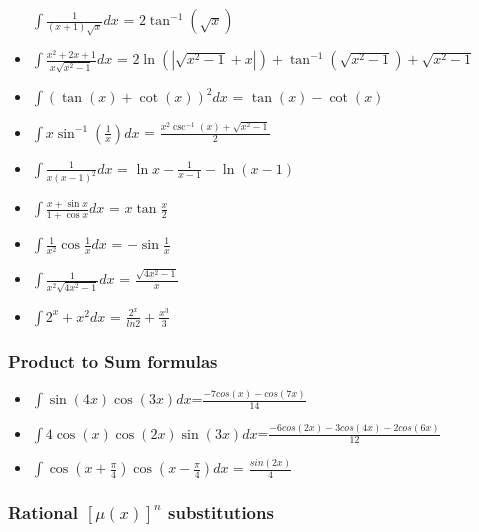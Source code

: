 \begin{itemize}
  \(\displaystyle\int \frac{1}{(x+1)\sqrt{x}}dx\) =
  \(2\tan^{-1}(\sqrt{x})\)
\item
  \(\displaystyle\int \frac{x^2 + 2x + 1}{x\sqrt{x^2-1}}dx\) =
  \(2\ln(|\sqrt{x^2-1}+x|)+\tan^{-1}(\sqrt{x^2-1})+\sqrt{x^2-1}\)
\item
  \(\displaystyle\int (\tan(x) + \cot(x))^2dx\) = \(\tan(x)-\cot(x)\)
\item
  \(\displaystyle\int x\sin^{-1}\left(\frac{1}{x}\right)dx\) =
  \(\frac{x^2\csc^{-1}(x)+\sqrt{x^2-1}}{2}\)
\item
  \(\displaystyle\int \frac{1}{x(x-1)^2}dx\) =
  \(\ln{x}-\frac{1}{x-1}-\ln(x-1)\)
\item
  \(\displaystyle\int \frac{x+\sin{x}}{1+\cos{x}}dx\) =
  \(x\tan{\frac{x}{2}}\)
\item
  \(\displaystyle\int \frac{1}{x^2}\cos{\frac{1}{x}}dx\) =
  \(-\sin{\frac{1}{x}}\)
\item
  \(\displaystyle\int \frac{1}{x^2\sqrt{4x^2-1}}dx\) =
  \(\frac{\sqrt{4x^2-1}}{x}\)
\item
  \(\displaystyle\int 2^x+x^2dx\) = \(\frac{2^x}{ln2}+\frac{x^3}{3}\)
\end{itemize}

\hypertarget{product-to-sum-formulas}{%
\subsubsection{Product to Sum formulas}\label{product-to-sum-formulas}}

\begin{itemize}
\tightlist
\item
  \(\displaystyle\int \sin(4x)\cos(3x)dx\)=\(\frac{-7cos(x)-cos(7x)}{14}\)
\item
  \(\displaystyle\int 4\cos(x)\cos(2x)\sin(3x)dx\)=\(\frac{-6cos(2x)-3cos(4x)-2cos(6x)}{12}\)
\item
  \(\displaystyle\int \cos\left(x+\frac{\pi}{4}\right) \cos\left(x- \frac{\pi}{4}\right)dx\)
  = \(\frac{sin(2x)}{4}\)
\end{itemize}

\hypertarget{rational-muxn-substitutions}{%
\subsubsection{\texorpdfstring{Rational \([\mu(x)]^n\)
substitutions}{Rational {[}\textbackslash{}mu(x){]}\^{}n substitutions}}\label{rational-muxn-substitutions}}

